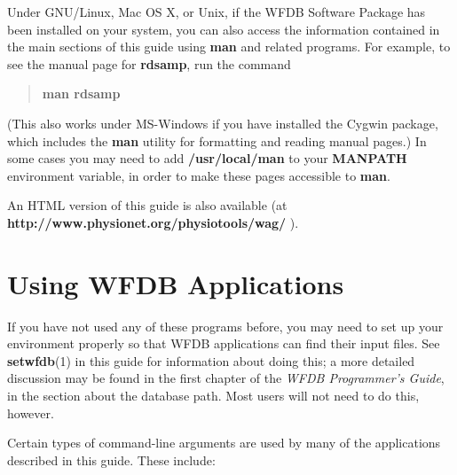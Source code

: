 \documentclass[twoside]{book}
\begin{document}
Under GNU/Linux, Mac OS X, or Unix, if the WFDB Software Package has
been installed on your system, you can also access the information
contained in the main sections of this guide using \textbf{man} and
related programs.  For example, to see the manual page for
\textbf{rdsamp}, run the command
\begin{quote}
	\textbf{man rdsamp}
\end{quote}
(This also works under MS-Windows if you have installed the
Cygwin package, which includes the \textbf{man} utility for formatting
and reading manual pages.)  In some cases you may need to add
\textbf{/usr/local/man} to your \textbf{MANPATH} environment variable, in
order to make these pages accessible to \textbf{man}.

An HTML version of this guide is also available (at
\textbf{http://www.physionet.org/physiotools/wag/} ).

\section*{Using WFDB Applications}

If you have not used any of these programs before, you may need to set up
your environment properly so that WFDB applications can find their
input files.  See \textbf{setwfdb}(1) in this guide for information about
doing this; a more detailed discussion may be found in the first chapter
of the \textit{WFDB Programmer's Guide}, in the section about the database
path.  Most users will not need to do this, however.

Certain types of command-line arguments are used by many of the applications
described in this guide.  These include:
\end{document}
